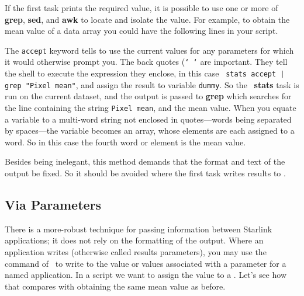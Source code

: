 \documentclass[twoside,11pt,nolof]{starlink}
\providecommand{\KAPPAref}{\xref{{\footnotesize KAPPA}}{sun95}{}}
\begin{document}
If the first task prints the required value, it is possible to use one
or more of \textbf{grep}, \textbf{sed}, and \textbf{awk} to locate and isolate
the value.  For example, to obtain the mean value of a data array you
could have the following lines in your script.

\begin{small}
\end{small}

The \texttt{accept} keyword tells  to use
the current values for any parameters for which it would otherwise
prompt you.  The back quotes (\texttt{`~`} are important.  They tell the
shell to execute the expression they enclose, in this case \mbox{{\tt
stats accept | grep "Pixel mean"}}, and assign the result to variable
\texttt{dummy}. So the \KAPPAref\normalsize\ \textbf{stats} task is run on
the current dataset, and the output is passed to \textbf{grep} which
searches for the line containing the string \texttt{Pixel mean}, and the
mean value.  When you equate a variable to a multi-word string not
enclosed in quotes---words being separated by spaces---the variable
becomes an array, whose elements are each assigned to a word.  So in
this case the fourth word or element is the mean value.

Besides being inelegant, this method demands that the format and
text of the output be fixed.  So it should be avoided where the
first task writes results to .

\subsection{Via Parameters
\label{sc4_se_info_parameter}}

There is a more-robust technique for passing information between
Starlink applications; it does not rely on the formatting of the
output. Where an application writes  (otherwise called results parameters), you
may use the  command of \KAPPAref\
to write to  the value
or values associated with a parameter for a named application. In a
script we want to assign the value to a .  Let's see how that compares with
obtaining the same mean value as before.
\end{document}
